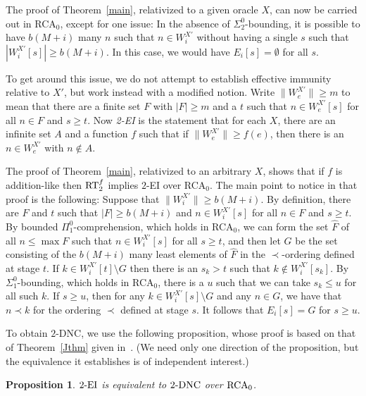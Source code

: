 \documentclass{amsart}
\newtheorem{prop}[thm]{Proposition}
\theoremstyle{definition}
\renewcommand{\leq}{\leqslant}
\renewcommand{\geq}{\geqslant}
\begin{document}
The proof of Theorem~\ref{main}, relativized to a given oracle $X$,
can now be carried out in RCA$_0$, except for one issue: In the
absence of $\Sigma^0_2$-bounding, it is possible to have $b(M+i)$ many
$n$ such that $n \in W_i^{X'}$ without having a single $s$ such that
$|W_i^{X'}[s]| \geq b(M+i)$. In this case, we would have
$E_i[s]=\emptyset$ for all $s$.

To get around this issue, we do not attempt to establish effective
immunity relative to $X'$, but work instead with a modified
notion. Write $\|W_e^{X'}\| \geq m$ to mean that there are a
finite set $F$ with $|F| \geq m$ and a $t$ such that $n \in
W_e^{X'}[s]$ for all $n \in F$ and $s \geq t$. Now \emph{2-EI} is
the statement that for each $X$, there are an infinite set $A$ and a
function $f$ such that if $\|W_e^{X'}\| \geq f(e)$, then there is
an $n \in W_e^{X'}$ with $n \notin A$.

The proof of Theorem~\ref{main}, relativized to an arbitrary $X$,
shows that if $f$ is addition-like then $\textup{RT}^f_2$ implies
$2$-EI over RCA$_0$. The main point to notice in that proof is the
following: Suppose that $\|W_i^{X'}\| \geq b(M+i)$. By definition,
there are $F$ and $t$ such that $|F| \geq b(M+i)$ and $n \in
W_i^{X'}[s]$ for all $n \in F$ and $s \geq t$. By bounded
$\Pi^0_1$-comprehension, which holds in RCA$_0$, we can form the set
$\widehat{F}$ of all $n \leq \max F$ such that $n \in W_i^{X'}[s]$ for
all $s \geq t$, and then let $G$ be the set consisting of the $b(M+i)$
many least elements of $\widehat{F}$ in the $\prec$-ordering defined
at stage $t$. If $k \in W_i^{X'}[t] \setminus G$ then there is an $s_k
> t$ such that $k \notin W_i^{X'}[s_k]$. By $\Sigma^0_1$-bounding,
which holds in RCA$_0$, there is a $u$ such that we can take $s_k \leq
u$ for all such $k$. If $s \geq u$, then for any $k \in W_i^{X'}[s]
\setminus G$ and any $n \in G$, we have that $n \prec k$ for the
ordering $\prec$ defined at stage $s$. It follows that $E_i[s]=G$ for
$s \geq u$.

To obtain $2$-DNC, we use the following proposition, whose proof is
based on that of Theorem~\ref{Jthm} given in~\cite{Jfpf}. (We need
only one direction of the proposition, but the equivalence it
establishes is of independent interest.)

\begin{prop}
$2\textup{-EI}$ is equivalent to $2\textup{-DNC}$ over
$\textup{RCA}_0$.
\end{prop}
\end{document}
